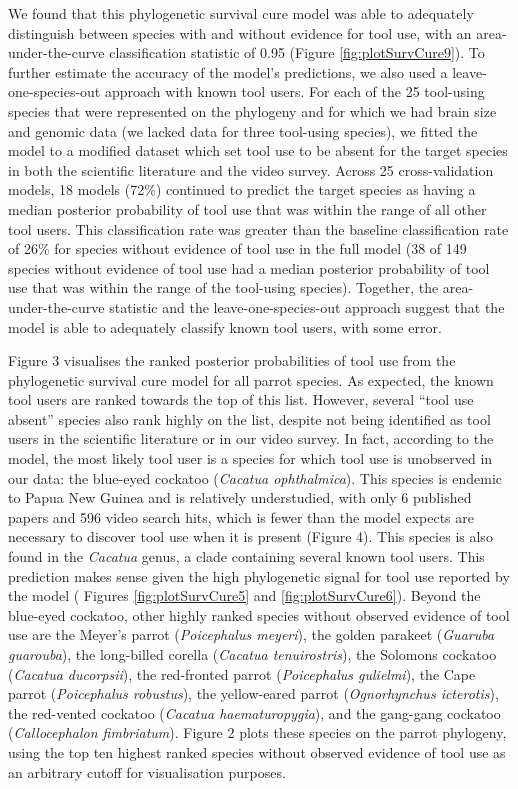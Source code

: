 \documentclass[
  man, donotrepeattitle,floatsintext]{apa6}
\begin{document}
We found that this phylogenetic survival cure model was able to adequately
distinguish between species with and without evidence for tool use, with an
area-under-the-curve classification statistic of
0.95 (Figure
\ref{fig:plotSurvCure9}). To further estimate the accuracy of the model's
predictions, we also used a leave-one-species-out approach with known tool
users. For each of the 25 tool-using species that were represented on the
phylogeny and for which we had brain size and genomic data (we lacked data for
three tool-using species), we fitted the model to a modified dataset which set
tool use to be absent for the target species in both the scientific literature
and the video survey. Across 25 cross-validation models,
18 models (72\%)
continued to predict the target species as having a median posterior probability
of tool use that was within the range of all other tool users. This
classification rate was greater than the baseline classification rate of
26\%
for species without evidence of tool use in the full model
(38
of 149 species without
evidence of tool use had a median posterior probability of tool use that was
within the range of the tool-using species). Together, the area-under-the-curve
statistic and the leave-one-species-out approach suggest that the model is able
to adequately classify known tool users, with some error.

Figure 3 visualises the ranked posterior probabilities of
tool use from the phylogenetic survival cure model for all parrot species. As
expected, the known tool users are ranked towards the top of this list. However,
several ``tool use absent'' species also rank highly on the list, despite not
being identified as tool users in the scientific literature or in our video
survey. In fact, according to the model, the most likely tool user is a species
for which tool use is unobserved in our data: the blue-eyed cockatoo (\emph{Cacatua
ophthalmica}). This species is endemic to Papua New Guinea and is relatively
understudied, with only 6 published papers
and 596 video search hits, which is fewer than the
model expects are necessary to discover tool use when it is present (Figure 4).
This species is also found in the \emph{Cacatua} genus, a
clade containing several known tool users. This prediction makes sense given the
high phylogenetic signal for tool use reported by the model (
Figures \ref{fig:plotSurvCure5} and \ref{fig:plotSurvCure6}). Beyond the
blue-eyed cockatoo, other highly ranked species without observed evidence of
tool use are the Meyer's parrot (\emph{Poicephalus meyeri}), the golden parakeet
(\emph{Guaruba guarouba}), the long-billed corella (\emph{Cacatua tenuirostris}), the
Solomons cockatoo (\emph{Cacatua ducorpsii}), the red-fronted parrot (\emph{Poicephalus
gulielmi}), the Cape parrot (\emph{Poicephalus robustus}), the yellow-eared parrot
(\emph{Ognorhynchus icterotis}), the red-vented cockatoo (\emph{Cacatua haematuropygia}),
and the gang-gang cockatoo (\emph{Callocephalon fimbriatum}). Figure 2
plots these species on the parrot phylogeny, using the top
ten highest ranked species without observed evidence of tool use as an arbitrary
cutoff for visualisation purposes.
\end{document}
